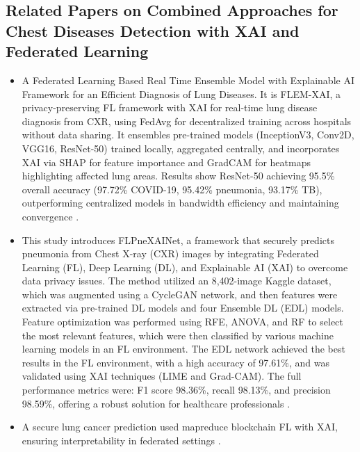 \subsection{Related Papers on Combined Approaches for Chest Diseases Detection with XAI and Federated Learning}
\begin{itemize} \itemsep 10pt
	\item A Federated Learning Based Real Time Ensemble Model with Explainable AI Framework for an Efficient Diagnosis of Lung Diseases. It is FLEM-XAI, a privacy-preserving FL framework with XAI for real-time lung disease diagnosis from CXR, using FedAvg for decentralized training across hospitals without data sharing. It ensembles pre-trained models (InceptionV3, Conv2D, VGG16, ResNet-50) trained locally, aggregated centrally, and incorporates XAI via SHAP for feature importance and GradCAM for heatmaps highlighting affected lung areas. Results show ResNet-50 achieving 95.5\% overall accuracy (97.72\% COVID-19, 95.42\% pneumonia, 93.17\% TB), outperforming centralized models in bandwidth efficiency and maintaining convergence \cite{ref37}.
	\item This study introduces FLPneXAINet, a framework that securely predicts pneumonia from Chest X-ray (CXR) images by integrating Federated Learning (FL), Deep Learning (DL), and Explainable AI (XAI) to overcome data privacy issues. The method utilized an 8,402-image Kaggle dataset, which was augmented using a CycleGAN network, and then features were extracted via pre-trained DL models and four Ensemble DL (EDL) models. Feature optimization was performed using RFE, ANOVA, and RF to select the most relevant features, which were then classified by various machine learning models in an FL environment. The EDL network achieved the best results in the FL environment, with a high accuracy of 97.61\%, and was validated using XAI techniques (LIME and Grad-CAM). The full performance metrics were: F1 score 98.36\%, recall 98.13\%, and precision 98.59\%, offering a robust solution for healthcare professionals \cite{ref38}.
	\item A secure lung cancer prediction used mapreduce blockchain FL with XAI, ensuring interpretability in federated settings \cite{ref39}.
\end{itemize}

